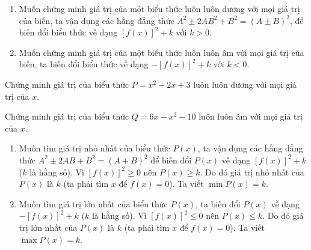 \begin{dang}
	\begin{enumerate}[\tickEX]
		\item Muốn chứng minh giá trị của một biểu thức luôn luôn dương với mọi giá trị của biến, ta vận dụng các hằng đẳng thức $A^2 \pm 2AB^2 + B^2 = (A \pm B)^2$, để biến đổi biểu thức về dạng $\left[f(x)\right]^2 + k$ với $k > 0$.
		\item Muốn chứng minh giá trị của một biểu thức luôn luôn âm với mọi giá trị của biến, ta biến đổi biểu thức về dạng $- \left[f(x)\right]^2 + k$ với $k < 0$.
	\end{enumerate}
\end{dang}
\begin{vd}
	Chứng minh giá trị của biểu thức $P = x^2 - 2x + 3$ luôn luôn dương với mọi giá trị của $x$.
\end{vd}
\begin{vd}
	Chứng minh giá trị của biểu thức $Q = 6x - x^2 - 10$ luôn luôn âm với mọi giá trị của $x$.
\end{vd}
\begin{dang}[Tìm giá trị nhỏ nhất, giá trị lớn nhất của biểu thức \newline $P(x) = ax^2 + bx +c$]
	\begin{enumerate}[\tickEX]
		\item Muốn tìm giá trị nhỏ nhất của biểu thức $P(x)$, ta vận dụng các hằng đẳng thức $A^2 \pm 2AB + B^2 = (A+B)^2$ để biến đổi $P(x)$ về dạng $[f(x)]^2 + k$ ($k$ là hằng số). Vì $[f(x)]^2 \geq 0$ nên $P(x) \geq k$. Do đó giá trị nhỏ nhất của $P(x)$ là $k$ (ta phải tìm $x$ để $f(x) = 0$). Ta viết $\min P(x) =k$.
		\item Muốn tìm giá trị lớn nhất của biểu thức $P(x)$, ta biến đổi $P(x)$ về dạng $-[f(x)]^2 + k$ ($k$ là hằng số). Vì $[f(x)]^2 \leq 0$ nên $P(x) \leq k$. Do đó giá trị lớn nhất của $P(x)$ là $k$ (ta phải tìm $x$ để $f(x) = 0$). Ta viết $\max P(x) =k$.
	\end{enumerate}
\end{dang}
